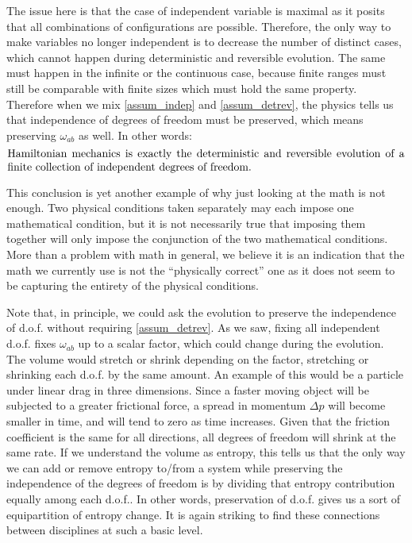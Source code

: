 The issue here is that the case of independent variable is maximal as it posits that all combinations of configurations are possible. Therefore, the only way to make variables no longer independent is to decrease the number of distinct cases, which cannot happen during deterministic and reversible evolution. The same must happen in the infinite or the continuous case, because finite ranges must still be comparable with finite sizes which must hold the same property. Therefore when we mix \ref{assum_indep} and \ref{assum_detrev}, the physics tells us that independence of degrees of freedom must be preserved, which means preserving $\omega_{ab}$ as well. In other words:
\begin{equation}
	\parbox{5in}{Hamiltonian mechanics is exactly the deterministic and reversible evolution of a finite collection of independent degrees of freedom.}
\end{equation} 

This conclusion is yet another example of why just looking at the math is not enough. Two physical conditions taken separately may each impose one mathematical condition, but it is not necessarily true that imposing them together will only impose the conjunction of the two mathematical conditions. More than a problem with math in general, we believe it is an indication that the math we currently use is not the ``physically correct'' one as it does not seem to be capturing the entirety of the physical conditions. 

Note that, in principle, we could ask the evolution to preserve the independence of d.o.f. without requiring \ref{assum_detrev}. As we saw, fixing all independent d.o.f. fixes $\omega_{ab}$ up to a scalar factor, which could change during the evolution. The volume would stretch or shrink depending on the factor, stretching or shrinking each d.o.f. by the same amount. An example of this would be a particle under linear drag in three dimensions. Since a faster moving object will be subjected to a greater frictional force, a spread in momentum $\Delta p$ will become smaller in time, and will tend to zero as time increases. Given that the friction coefficient is the same for all directions, all degrees of freedom will shrink at the same rate. If we understand the volume as entropy, this tells us that the only way we can add or remove entropy to/from a system while preserving the independence of the degrees of freedom is by dividing that entropy contribution equally among each d.o.f.. In other words, preservation of d.o.f. gives us a sort of equipartition of entropy change. It is again striking to find these connections between disciplines at such a basic level.

